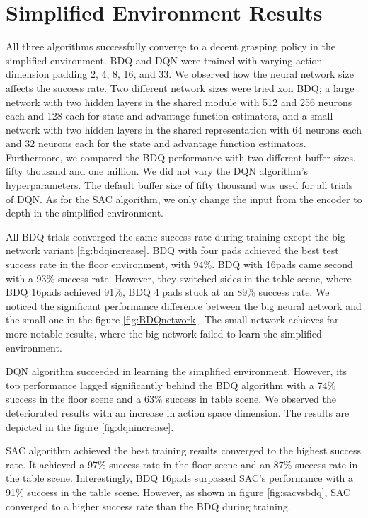 \section{Simplified Environment Results}

All three algorithms successfully converge to a decent grasping policy in the simplified environment. BDQ and DQN  were trained with varying action dimension padding 2, 4, 8, 16, and 33.
We observed how the neural network size affects the success rate. Two different network sizes were tried xon BDQ; a large network with two hidden layers in the shared module with 512 and 256 neurons each and 128 each for state and advantage function estimators, and a small network with two hidden layers in the shared representation with 64 neurons each and 32 neurons each for the state and advantage function estimators. Furthermore, we compared the BDQ performance with two different buffer sizes, fifty thousand and one million. We did not vary the DQN algorithm's hyperparameters. The default buffer size of fifty thousand was used for all trials of DQN.
As for the SAC algorithm, we only change the input from the encoder to depth in the simplified environment.

All BDQ trials converged the same success rate during training except the big network variant \ref{fig:bdqincrease}. BDQ with four pads achieved the best test success rate in the floor environment, with 94\%. BDQ with 16pads came second with a 93\% success rate. However, they switched sides in the table scene, where BDQ 16pads achieved 91\%, BDQ 4 pads stuck at an 89\% success rate. We noticed the significant performance difference between the big neural network and the small one in the figure \ref{fig:BDQnetwork}. The small network achieves far more notable results, where the big network failed to learn the simplified environment.

DQN algorithm succeeded in learning the simplified environment. However, its top performance lagged significantly behind the BDQ algorithm with a 74\% success in the floor scene and a 63\% success in table scene. We observed the deteriorated results with an increase in action space dimension. The results are depicted in the figure \ref{fig:dqnincrease}.

SAC algorithm achieved the best training results converged to the highest success rate. It achieved a 97\% success rate in the floor scene and an 87\% success rate in the table scene. Interestingly, BDQ 16pads surpassed SAC's performance with a 91\% success in the table scene. However, as shown in figure \ref{fig:sacvsbdq}, SAC converged to a higher success rate than the BDQ during training.

